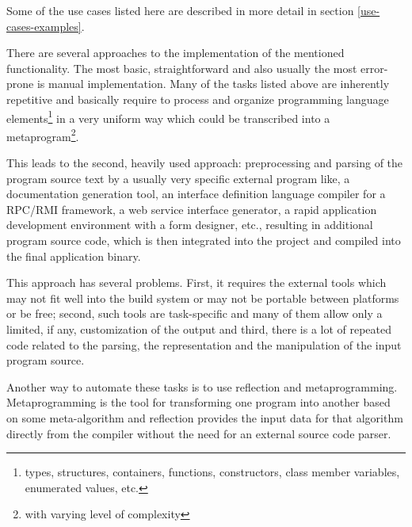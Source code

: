 Some of the use cases listed here are described in more detail in section
\ref{use-cases-examples}.

There are several approaches to the implementation of the mentioned functionality.
The most basic, straightforward and also usually the most
error-prone is manual implementation. Many of the tasks listed above
are inherently repetitive and basically require to process and organize
programming language elements\footnote{types, structures, containers, functions,
constructors, class member variables, enumerated values, etc.}
in a very uniform way which could be transcribed into a metaprogram\footnote{with
varying level of complexity}.

This leads to the second, heavily used approach: preprocessing
and parsing of the program source text by a usually very specific external
program like, a documentation generation tool, an interface definition language
compiler for a RPC/RMI framework, a web service interface generator,
a rapid application development environment with a form designer, etc.,
resulting in additional program source code, which is then integrated into
the project and compiled into the final application binary.

This approach has several problems. First, it requires the external
tools which may not fit well into the build system or may not be portable
between platforms or be free; second, such tools are task-specific
and many of them allow only a limited, if any, customization of the output
and third, there is a lot of repeated code related to the parsing, the
representation and the manipulation of the input program source.

Another way to automate these tasks is to use reflection and metaprogramming.
Metaprogramming is the tool for transforming one program into another based
on some meta-algorithm and reflection provides the input data for that algorithm
directly from the compiler without the need for an external source code parser.

